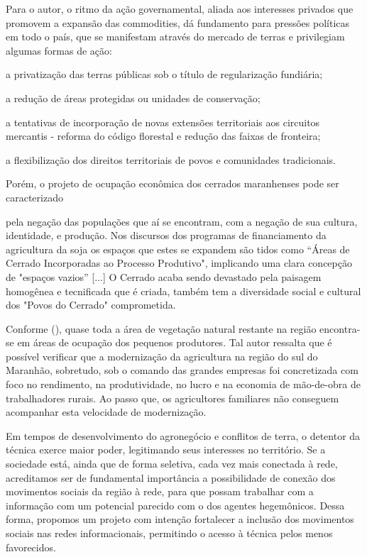 Para o autor, o ritmo da ação governamental, aliada aos interesses privados que promovem a expansão das commodities, dá fundamento para pressões políticas em todo o país, que se manifestam através do mercado de terras e privilegiam algumas formas de ação:

\begin{alineas}
   \item a privatização das terras públicas sob o título de regularização fundiária;
   \item a redução de áreas protegidas ou unidades de conservação;
   \item a tentativas de incorporação de novas extensões territoriais aos circuitos mercantis - reforma do código florestal e redução das faixas de fronteira;
   \item a flexibilização dos direitos territoriais de povos e comunidades tradicionais.
\end{alineas}

Porém, o projeto de ocupação econômica dos cerrados maranhenses pode ser caracterizado

\begin{citacao}
pela negação das populações que aí se encontram, com a negação de sua cultura, identidade, e produção. Nos discursos dos programas de financiamento da agricultura da soja os espaços que estes se expandem são tidos como “Áreas de Cerrado Incorporadas ao Processo Produtivo", implicando uma clara concepção de "espaços vazios” [...] O Cerrado acaba sendo devastado pela paisagem homogênea e tecnificada que é criada,  também tem a diversidade social e cultural dos "Povos do Cerrado" comprometida. \cite[p. 13]{rodrigues_alencar}
\end{citacao}

Conforme  (\citeyear{studte2008}), quase toda a área de vegetação natural restante na região encontra-se em áreas de ocupação dos pequenos produtores.  Tal autor ressalta  que é possível verificar que a modernização  da  agricultura na  região do sul do Maranhão, sobretudo, sob o comando  das grandes empresas foi concretizada  com foco no rendimento,  na produtividade, no lucro e na economia de mão-de-obra de trabalhadores rurais.  Ao passo que, os agricultores familiares não conseguem acompanhar esta velocidade de modernização.



Em tempos de desenvolvimento do agronegócio e conflitos de terra, o detentor da técnica exerce maior poder, legitimando seus interesses no território. Se a sociedade está, ainda que de forma seletiva, cada vez mais conectada à rede, acreditamos ser de fundamental importância a possibilidade de conexão dos movimentos sociais da região à rede, para que possam trabalhar com a informação com um potencial parecido com o dos agentes hegemônicos. Dessa forma, propomos um projeto com intenção fortalecer a inclusão dos movimentos sociais nas redes informacionais, permitindo o acesso à técnica pelos menos favorecidos.

